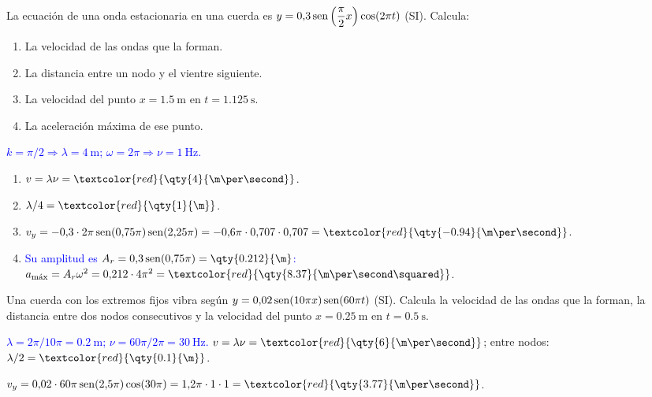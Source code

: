 \begin{exercise}
    La ecuación de una onda estacionaria en una cuerda es \(y = 0{,}3\operatorname{sen}\left(\dfrac{\pi}{2}x\right)\cos(2\pi t)\) (SI). Calcula:
    \begin{enumerate}[label=\letraminuscula]
        \item La velocidad de las ondas que la forman.
        \item La distancia entre un nodo y el vientre siguiente.
        \item La velocidad del punto \(x = \qty{1.5}{\m}\) en \(t = \qty{1.125}{\second}\).
        \item La aceleración máxima de ese punto.
    \end{enumerate}
    \begin{solu}
        \textcolor{blue}{\(k = \pi/2 \Rightarrow \lambda = \qty{4}{\m}\); \(\omega = 2\pi \Rightarrow \nu = \qty{1}{\hertz}\).}
        \begin{enumerate}[label=\letraminuscula]
            \item \(v = \lambda\nu = \textcolor{red}{\qty{4}{\m\per\second}}\).
            \item \(\lambda/4 = \textcolor{red}{\qty{1}{\m}}\).
            \item \(v_y = -0{,}3\cdot 2\pi\sen(0{,}75\pi)\sen(2{,}25\pi) = -0{,}6\pi\cdot 0{,}707\cdot 0{,}707 = \textcolor{red}{\qty{-0.94}{\m\per\second}}\).
            \item \textcolor{blue}{Su amplitud es \(A_r = 0{,}3\sen(0{,}75\pi) = \qty{0.212}{\m}\):} \(a_{\text{máx}} = A_r\omega^2 = 0{,}212\cdot 4\pi^2 = \textcolor{red}{\qty{8.37}{\m\per\second\squared}}\).
        \end{enumerate}
    \end{solu}
\end{exercise}

\begin{exercise}
    Una cuerda con los extremos fijos vibra según \(y = 0{,}02\operatorname{sen}(10\pi x)\operatorname{sen}(60\pi t)\) (SI). Calcula la velocidad de las
    ondas que la forman, la distancia entre dos nodos consecutivos y la velocidad del punto \(x = \qty{0.25}{\m}\) en
    \(t = \qty{0.5}{\second}\).
    \begin{solu}
        \textcolor{blue}{\(\lambda = 2\pi/10\pi = \qty{0.2}{\m}\); \(\nu = 60\pi/2\pi = \qty{30}{\hertz}\).}
        \(v = \lambda\nu = \textcolor{red}{\qty{6}{\m\per\second}}\); entre nodos: \(\lambda/2 = \textcolor{red}{\qty{0.1}{\m}}\).

        \(v_y = 0{,}02\cdot 60\pi\sen(2{,}5\pi)\cos(30\pi) = 1{,}2\pi\cdot 1\cdot 1 = \textcolor{red}{\qty{3.77}{\m\per\second}}\).
    \end{solu}
\end{exercise}

